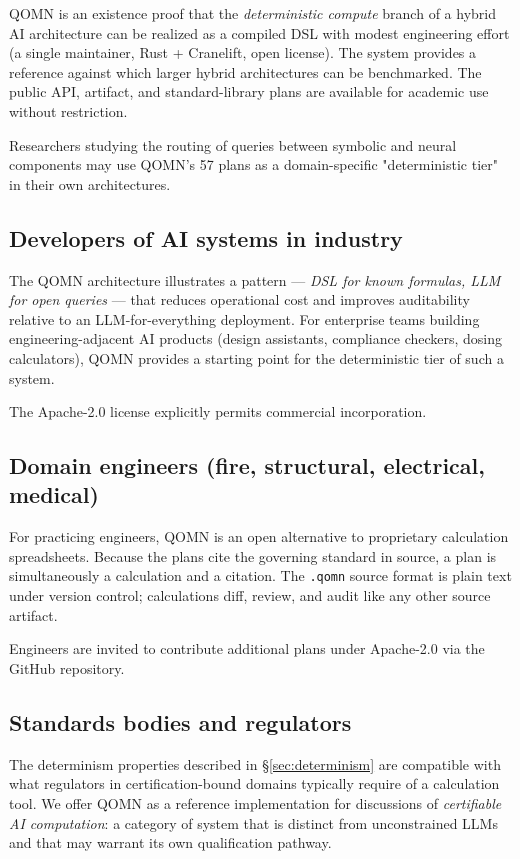 \documentclass[11pt,a4paper]{article}
\begin{document}
QOMN is an existence proof that the \emph{deterministic compute} branch of a hybrid AI architecture can be realized as a compiled DSL with modest engineering effort (a single maintainer, Rust + Cranelift, open license). The system provides a reference against which larger hybrid architectures can be benchmarked. The public API, artifact, and standard-library plans are available for academic use without restriction.

Researchers studying the routing of queries between symbolic and neural components may use QOMN's 57 plans as a domain-specific "deterministic tier" in their own architectures.

\subsection{Developers of AI systems in industry}

The QOMN architecture illustrates a pattern --- \emph{DSL for known formulas, LLM for open queries} --- that reduces operational cost and improves auditability relative to an LLM-for-everything deployment. For enterprise teams building engineering-adjacent AI products (design assistants, compliance checkers, dosing calculators), QOMN provides a starting point for the deterministic tier of such a system.

The Apache-2.0 license explicitly permits commercial incorporation.

\subsection{Domain engineers (fire, structural, electrical, medical)}

For practicing engineers, QOMN is an open alternative to proprietary calculation spreadsheets. Because the plans cite the governing standard in source, a plan is simultaneously a calculation and a citation. The \texttt{.qomn} source format is plain text under version control; calculations diff, review, and audit like any other source artifact.

Engineers are invited to contribute additional plans under Apache-2.0 via the GitHub repository.

\subsection{Standards bodies and regulators}

The determinism properties described in \S\ref{sec:determinism} are compatible with what regulators in certification-bound domains typically require of a calculation tool. We offer QOMN as a reference implementation for discussions of \emph{certifiable AI computation}: a category of system that is distinct from unconstrained LLMs and that may warrant its own qualification pathway.
\end{document}
